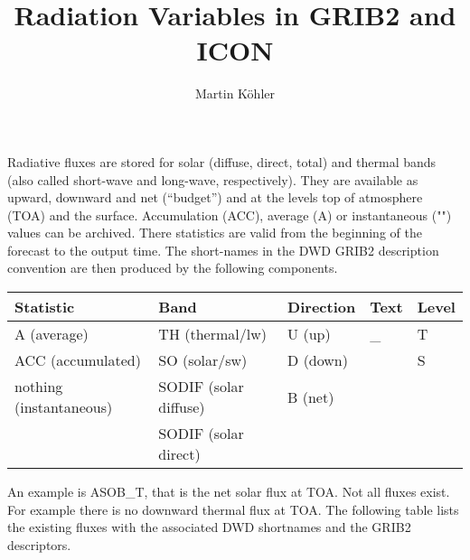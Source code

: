 \documentclass[11pt,notitlepage]{article}  %
\title{Radiation Variables in GRIB2 and ICON}
\author{Martin K\"ohler}
\begin{document}
  
\maketitle


Radiative fluxes are stored for solar (diffuse, direct, total) and thermal bands (also called short-wave and long-wave, respectively).  
They are available as upward, downward and net (``budget'') and at the levels top of atmosphere (TOA) and the surface.  
Accumulation (ACC), average (A) or instantaneous ("") values can be archived.  There statistics are valid from the beginning of the forecast
to the output time.  
The short-names in the DWD GRIB2 description convention are then produced by the following components.


\vspace{1cm}
\begin{tabular}{l l l l l}  
\textbf{Statistic}      & \textbf{Band}         & \textbf{Direction} & \textbf{Text} & \textbf{Level} \\
\hline
A (average)             & TH (thermal/lw)       & U (up)             &  \_           &  T             \\
ACC (accumulated)       & SO (solar/sw)         & D (down)           &               &  S             \\
nothing (instantaneous) & SODIF (solar diffuse) & B (net)            &               &                \\
                        & SODIF (solar direct)  &                    &               &                \\
\hline
\end{tabular}
\vspace{1cm}


An example is ASOB\_T, that is the net solar flux at TOA.  Not all fluxes exist.  For example there is no downward thermal flux at TOA.  The following table 
lists the existing fluxes with the associated DWD shortnames and the GRIB2 descriptors. 
\end{document}
